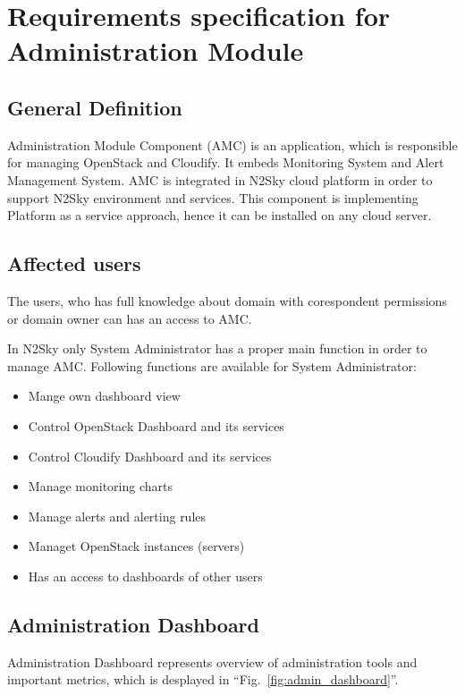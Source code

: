
\section{Requirements specification for Administration Module}\label{Administration components}

\subsection{General Definition}\label{General Definition AMC}

Administration Module Component (AMC) is an application, which is responsible for managing OpenStack and Cloudify. It embeds Monitoring System and Alert Management System. AMC is integrated in N2Sky cloud platform in order to support N2Sky environment and services. This component is implementing Platform as a service approach, hence it can be installed on any cloud server. 

\subsection{Affected users}\label{Affected users}

The users, who has full knowledge about domain with corespondent permissions or domain owner can has an access to AMC.

In N2Sky only System Administrator has a proper main function in order to manage AMC.
Following functions are available for System Administrator:
\begin{itemize}
\item Mange own dashboard view
\item Control OpenStack Dashboard and its services
\item Control Cloudify Dashboard and its services
\item Manage monitoring charts
\item Manage alerts and alerting rules
\item Managet OpenStack instances (servers)
\item Has an access to dashboards of other users
\end{itemize}



\subsection{Administration Dashboard}\label{Administration Dashboard}

Administration Dashboard represents overview of administration tools and important metrics, which is desplayed in ``Fig.~\ref{fig:admin_dashboard}''. 

